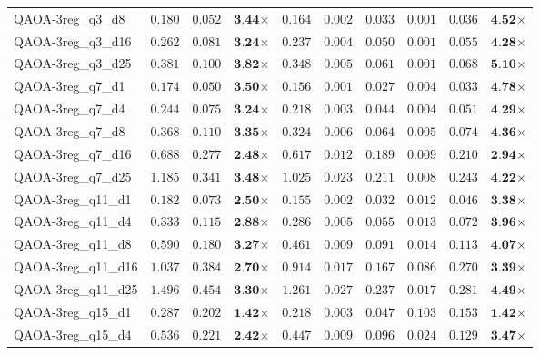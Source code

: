 \begin{table*}[t]
{\begin{tabular}{| l || r r c || r r r r r c |}
QAOA-3reg\_q3\_d8 & $0.180$ & $0.052$ & $\textbf{3.44}$$\times$ & $0.164$ & $0.002$ & $0.033$ & $0.001$ & $0.036$ & $\textbf{4.52}$$\times$ \\
QAOA-3reg\_q3\_d16 & $0.262$ & $0.081$ & $\textbf{3.24}$$\times$ & $0.237$ & $0.004$ & $0.050$ & $0.001$ & $0.055$ & $\textbf{4.28}$$\times$ \\
QAOA-3reg\_q3\_d25 & $0.381$ & $0.100$ & $\textbf{3.82}$$\times$ & $0.348$ & $0.005$ & $0.061$ & $0.001$ & $0.068$ & $\textbf{5.10}$$\times$ \\
QAOA-3reg\_q7\_d1 & $0.174$ & $0.050$ & $\textbf{3.50}$$\times$ & $0.156$ & $0.001$ & $0.027$ & $0.004$ & $0.033$ & $\textbf{4.78}$$\times$ \\
QAOA-3reg\_q7\_d4 & $0.244$ & $0.075$ & $\textbf{3.24}$$\times$ & $0.218$ & $0.003$ & $0.044$ & $0.004$ & $0.051$ & $\textbf{4.29}$$\times$ \\
QAOA-3reg\_q7\_d8 & $0.368$ & $0.110$ & $\textbf{3.35}$$\times$ & $0.324$ & $0.006$ & $0.064$ & $0.005$ & $0.074$ & $\textbf{4.36}$$\times$ \\
QAOA-3reg\_q7\_d16 & $0.688$ & $0.277$ & $\textbf{2.48}$$\times$ & $0.617$ & $0.012$ & $0.189$ & $0.009$ & $0.210$ & $\textbf{2.94}$$\times$ \\
QAOA-3reg\_q7\_d25 & $1.185$ & $0.341$ & $\textbf{3.48}$$\times$ & $1.025$ & $0.023$ & $0.211$ & $0.008$ & $0.243$ & $\textbf{4.22}$$\times$ \\
QAOA-3reg\_q11\_d1 & $0.182$ & $0.073$ & $\textbf{2.50}$$\times$ & $0.155$ & $0.002$ & $0.032$ & $0.012$ & $0.046$ & $\textbf{3.38}$$\times$ \\
QAOA-3reg\_q11\_d4 & $0.333$ & $0.115$ & $\textbf{2.88}$$\times$ & $0.286$ & $0.005$ & $0.055$ & $0.013$ & $0.072$ & $\textbf{3.96}$$\times$ \\
QAOA-3reg\_q11\_d8 & $0.590$ & $0.180$ & $\textbf{3.27}$$\times$ & $0.461$ & $0.009$ & $0.091$ & $0.014$ & $0.113$ & $\textbf{4.07}$$\times$ \\
QAOA-3reg\_q11\_d16 & $1.037$ & $0.384$ & $\textbf{2.70}$$\times$ & $0.914$ & $0.017$ & $0.167$ & $0.086$ & $0.270$ & $\textbf{3.39}$$\times$ \\
QAOA-3reg\_q11\_d25 & $1.496$ & $0.454$ & $\textbf{3.30}$$\times$ & $1.261$ & $0.027$ & $0.237$ & $0.017$ & $0.281$ & $\textbf{4.49}$$\times$ \\
QAOA-3reg\_q15\_d1 & $0.287$ & $0.202$ & $\textbf{1.42}$$\times$ & $0.218$ & $0.003$ & $0.047$ & $0.103$ & $0.153$ & $\textbf{1.42}$$\times$ \\
QAOA-3reg\_q15\_d4 & $0.536$ & $0.221$ & $\textbf{2.42}$$\times$ & $0.447$ & $0.009$ & $0.096$ & $0.024$ & $0.129$ & $\textbf{3.47}$$\times$ \\

\end{tabular}}
\end{table*}
